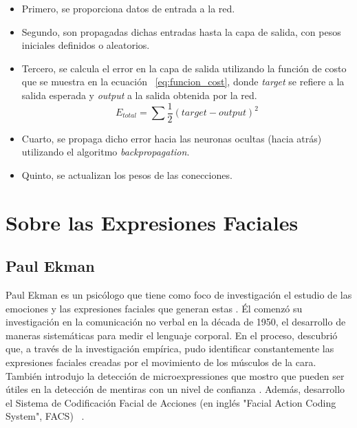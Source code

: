 \begin{itemize}
\item Primero, se proporciona datos de entrada a la red.
\item Segundo, son propagadas dichas entradas hasta la capa de salida, con pesos iniciales definidos o
aleatorios.
\item Tercero, se calcula el error en la capa de salida utilizando la función de costo que se muestra en la ecuación ~\ref{eq:funcion_cost}, donde \textit{target} se refiere a la salida esperada y \textit{output} a la salida obtenida por la red.
\begin{equation}\label{eq:funcion_cost}
E_{total} = \sum \frac{1}{2}(target - output)^2
\end{equation}
\item Cuarto, se propaga dicho error hacia las neuronas ocultas (hacia atrás) utilizando el algoritmo \textit{backpropagation}.
\item Quinto, se actualizan los pesos de las conecciones.
\end{itemize}

\section{Sobre las Expresiones Faciales}
\subsection{Paul Ekman}
Paul Ekman es un psicólogo que tiene como foco de investigación el estudio de las emociones y las expresiones faciales que generan estas \cite{ekman1993facial}.  Él comenzó su investigación en la comunicación no verbal en la década de 1950, el desarrollo de maneras sistemáticas para medir el lenguaje corporal. En el proceso, descubrió que, a través de la investigación empírica, pudo identificar constantemente las expresiones faciales creadas por el movimiento de los músculos de la cara. También introdujo la detección de microexpressiones que mostro que pueden ser útiles en la detección de mentiras con un nivel de confianza\cite{ekman1996don} . Además, desarrollo el   Sistema de Codificación Facial de Acciones (en inglés "Facial Action Coding System", FACS)  ~\cite{29ekman2016scientists}.


